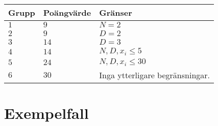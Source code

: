 \noindent
\begin{tabular}{| l | l | l |}
  \hline
  Grupp & Poängvärde & Gränser \\ \hline
  $1$    & $9$        &  $N=2$ \\ \hline 
  $2$    & $9$        &  $D=2$ \\ \hline
  $3$    & $14$        &  $D=3$ \\ \hline
  $4$    & $14$        &  $N, D, x_i \leq 5$ \\ \hline 
  $5$    & $24$        &  $N, D, x_i \leq 30$ \\ \hline
  $6$    & $30$        &  Inga ytterligare begränsningar. \\ \hline
\end{tabular}

\section*{Exempelfall}
